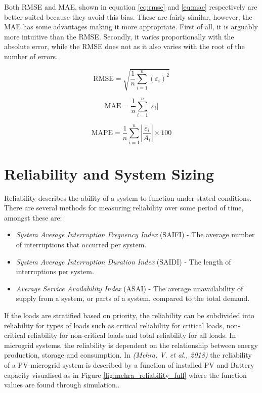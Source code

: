 Both RMSE and MAE, shown in equation \ref{eq:rmse} and \ref{eq:mae} respectively are better suited because they avoid this bias. These are fairly similar, however, the MAE has some advantages making it more appropriate. First of all, it is arguably more intuitive than the RMSE. Secondly, it varies proportionally with the absolute error, while the RMSE does not as it also varies with the root of the number of errors\cite{Willmott2005-go}.

\begin{equation}
    \text{RMSE} = \sqrt{\frac{1}{n} \sum_{i=1}^{n} (\varepsilon_i)^2}
    \label{eq:rmse}
\end{equation}

\begin{equation}
    \text{MAE} = \frac{1}{n} \sum_{i=1}^{n} |\varepsilon_i|
    \label{eq:mae}
\end{equation}

\begin{equation}
    \text{MAPE} = \frac{1}{n} \sum_{i=1}^{n} \left|\frac{\varepsilon_i}{A_i}\right| \times 100
    \label{eq:mape}
\end{equation}




\section{Reliability and System Sizing}\label{sec:reliability}
Reliability describes the ability of a system to function under stated conditions. There are several methods for measuring reliability over some period of time, amongst these are:
\begin{itemize}
    \item \textit{System Average Interruption Frequency Index} (SAIFI)    -   The average number of interruptions that occurred per system.
    \item \textit{System Average Interruption Duration Index} (SAIDI)    -   The length of interruptions per system.
    \item \textit{Average Service Availability Index} (ASAI)    -   The average unavailability of supply from a system, or parts of a system, compared to the total demand. 
\end{itemize}

If the loads are stratified based on priority, the reliability can be subdivided into reliability for types of loads such as critical reliability for critical loads, non-critical reliability for non-critical loads and total reliability for all loads. In microgrid systems, the reliability is dependent on the relationship between energy production, storage and consumption. In \textit{(Mehra, V. et al., 2018)} the reliability of a PV-microgrid system is described by a function of installed PV and Battery capacity visualised as in Figure \ref{fig:mehra_reliability_full} where the function values are found through simulation.\cite{Mehra2018-xs}. 

